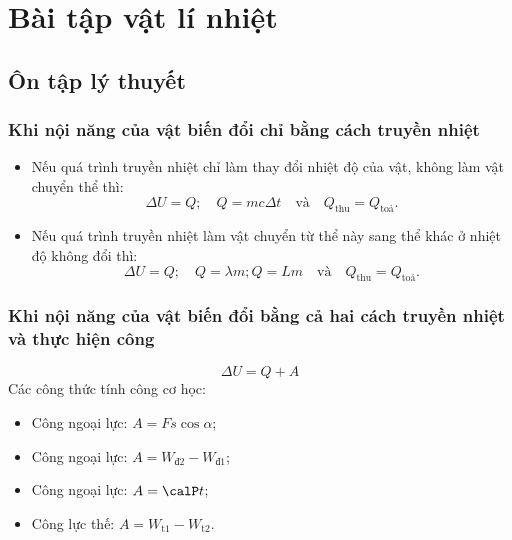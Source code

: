 \let\lesson\undefined
\newcommand{\lesson}{\phantomlesson{Bài tập vật lí nhiệt}}
\chapter[Bài tập vật lí nhiệt]{Bài tập vật lí nhiệt}
\section{Ôn tập lý thuyết}
\subsection{Khi nội năng của vật biến đổi chỉ bằng cách truyền nhiệt}
\begin{itemize}
	\item Nếu quá trình truyền nhiệt chỉ làm thay đổi nhiệt độ của vật, không làm vật chuyển thể thì:
	$$\Delta U=Q; \quad Q=mc\Delta t\quad \text{và}\quad Q_\text{thu}=Q_\text{toả}.$$
	\item Nếu quá trình truyền nhiệt làm vật chuyển từ thể này sang thể khác ở nhiệt độ không đổi thì:
	$$\Delta U=Q; \quad Q=\lambda m; Q=Lm \quad \text{và}\quad Q_\text{thu}=Q_\text{toả}.$$
\end{itemize}
\subsection{Khi nội năng của vật biến đổi bằng cả hai cách truyền nhiệt và thực hiện công}
$$\Delta U=Q+A$$
Các công thức tính công cơ học:
\begin{itemize}
	\item Công ngoại lực: $A=Fs\cos\alpha$;
	\item Công ngoại lực: $A=W_\text{đ2}-W_\text{đ1}$;
	\item Công ngoại lực:
	$A=\calP t$;
	\item Công lực thế: $A=W_\text{t1}-W_\text{t2}$.
\end{itemize}

